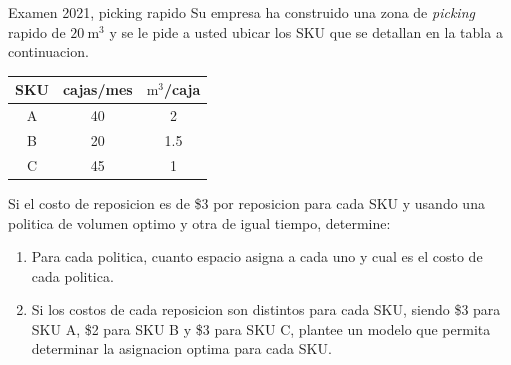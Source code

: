 \begin{enunciado}{Examen 2021, picking rapido}
Su empresa ha construido una zona de \emph{picking} rapido de $20\ \text{m}^3$ y se le pide a usted ubicar los SKU que se detallan en la tabla a continuacion.

\begin{center}
\begin{tabular}{c|cc}
\toprule
SKU & cajas/mes & $\text{m}^3$/caja\\
\midrule
A & 40 & 2\\
B & 20 & 1.5\\
C & 45 & 1\\
\bottomrule
\end{tabular}
\end{center}

Si el costo de reposicion es de \$3 por reposicion para cada SKU y usando una politica de volumen optimo y otra de igual tiempo, determine:

\begin{enumerate}[label=\alph*)]
  \item Para cada politica, cuanto espacio asigna a cada uno y cual es el costo de cada politica.
  \item Si los costos de cada reposicion son distintos para cada SKU, siendo \$3 para SKU A, \$2 para SKU B y \$3 para SKU C, plantee un modelo que permita determinar la asignacion optima para cada SKU.
\end{enumerate}
\end{enunciado}

